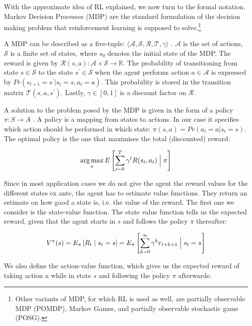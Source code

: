 With the approximate idea of RL explained, we now turn to the formal notation. Markov Decision Processes (MDP) are the standard formulation of the decision making problem that reinforcement learning is supposed to solve.\footnote{Other variants of MDP, for which RL is used as well, are partially observable MDP (POMDP), Markov Games, and partially observable stochastic game (POSG).}

A MDP can be described as a five-tuple: $\langle \mathcal{A,S,R,T,\gamma} \rangle$ \citep{sutton1998reinforcement}. $\mathcal{A}$ is the set of actions, $\mathcal{S}$ is a finite set of states, where $s_0$ denotes the initial state of the MDP. The reward is given by $\mathcal{R}(s,a): \mathcal{A} \times \mathcal{S} \rightarrow \mathds{R}$. The probability of transitioning from state $s \in \mathcal{S}$ to the state $s^{\prime} \in \mathcal{S}$ when the agent performs action $a \in \mathcal{A}$ is expressed by ${Pr(s_{t+1} = s^{\prime} | s_t =  s, a_t = a)}$. This probability is stored in the transition matrix $\mathcal{T}(s,a,s^{\prime})$. Lastly, $\gamma \in [0,1]$ is a discount factor on $\mathcal{R}$. 

A solution to the problem posed by the MDP is given in the form of a policy $\pi: S \rightarrow A$ \citep{abel2016reinforcement}. A policy is a mapping from states to actions. In our case it specifies which action should be performed in which state: $\pi(s,a) = Pr \left(a_t = a | s_t = s \right)$. The optimal policy is the one that maximises the total (discounted) reward: 

\begin{equation}
    \operatorname*{arg\,max}_\pi E \left[ \sum_{t=0}^T \gamma^t R(s_t, a_t)  \Bigm| \pi \right]
\end{equation}

Since in most application cases we do not give the agent the reward values for the different states ex ante, the agent has to estimate value functions. They return an estimate on how good a state is, i.e. the value of the reward. The first one we consider is the state-value function. The state value function tells us the expected reward, given that the agent starts in $s$ and follows the policy $\pi$ thereafter:

\begin{equation}
    V^\pi (s) = E_\pi \left[ R_t \mid s_t = s \right] = E_\pi \left[  \sum_{k = 0}^{\infty} \gamma^k r_{t+k+1} \Bigm| s_t = s \right] 
\end{equation}  

We also define the action-value function, which gives us the expected reward of taking action $a$ while in state $s$ and following the policy $\pi$ afterwards:

